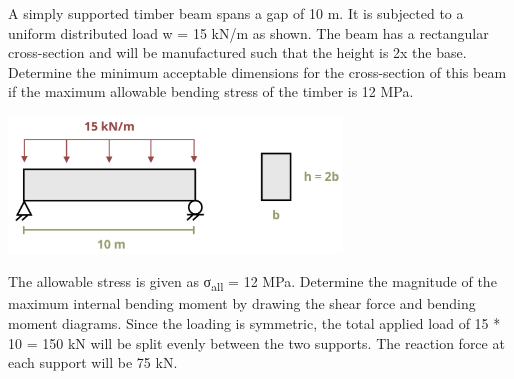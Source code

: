 \documentclass[
  letterpaper,
  DIV=11,
  numbers=noendperiod]{scrreprt}
\theoremstyle{definition}
\theoremstyle{remark}
\begin{document}
\begin{tcolorbox}[enhanced jigsaw, leftrule=.75mm, colbacktitle=quarto-callout-tip-color!10!white, breakable, opacityback=0, colback=white, titlerule=0mm, toprule=.15mm, colframe=quarto-callout-tip-color-frame, coltitle=black, title={Example 9.4}, toptitle=1mm, bottomrule=.15mm, rightrule=.15mm, left=2mm, arc=.35mm, opacitybacktitle=0.6, bottomtitle=1mm]

A simply supported timber beam spans a gap of 10 m. It is subjected to a
uniform distributed load w = 15 kN/m as shown. The beam has a
rectangular cross-section and will be manufactured such that the height
is 2x the base. Determine the minimum acceptable dimensions for the
cross-section of this beam if the maximum allowable bending stress of
the timber is 12 MPa.

\begin{center}
\includegraphics[width=3.48958in,height=\textheight]{images/CH9 PNGs/Example 9.4 part 1.png}
\end{center}

\begin{tcolorbox}[enhanced jigsaw, leftrule=.75mm, colbacktitle=quarto-callout-tip-color!10!white, breakable, opacityback=0, colback=white, titlerule=0mm, toprule=.15mm, colframe=quarto-callout-tip-color-frame, coltitle=black, title={Solution}, toptitle=1mm, bottomrule=.15mm, rightrule=.15mm, left=2mm, arc=.35mm, opacitybacktitle=0.6, bottomtitle=1mm]

The allowable stress is given as σ\textsubscript{all} = 12 MPa.
Determine the magnitude of the maximum internal bending moment by
drawing the shear force and bending moment diagrams. Since the loading
is symmetric, the total applied load of 15 * 10 = 150 kN will be split
evenly between the two supports. The reaction force at each support will
be 75 kN.


\end{tcolorbox}
\end{tcolorbox}
\end{document}
